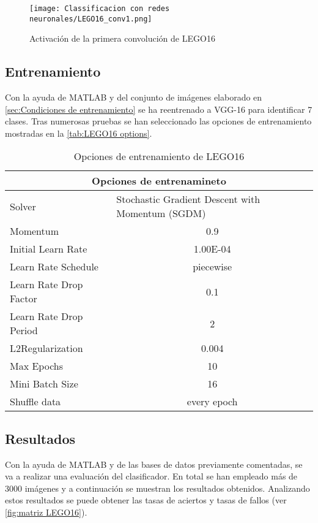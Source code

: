 \begin{figure}[ht]  %
	\centering
	\texttt{[image: Classificacion con redes neuronales/LEGO16\_conv1.png]}
	\caption{Activación de la primera convolución de LEGO16}
	\label{fig:LEGO16 conv}
	\vspace{-5pt}
\end{figure}


\subsection{Entrenamiento}
Con la ayuda de MATLAB y del conjunto de imágenes elaborado en \autoref{sec:Condiciones de entrenamiento} se ha reentrenado a VGG-16 para identificar 7 clases. Tras numerosas pruebas se han seleccionado las opciones de entrenamiento mostradas en la \autoref{tab:LEGO16 options}.

\begin{table}[ht]
  \centering
    \begin{tabular}{|l|c|}
    \hline
    \multicolumn{2}{|c|}{Opciones de entrenamineto} \\
    \hline
    Solver & \multicolumn{1}{l|}{Stochastic Gradient Descent with Momentum (SGDM)} \\
    \hline
    Momentum & 0.9 \\
    \hline
    Initial Learn Rate & 1.00E-04 \\
    \hline
    Learn Rate Schedule & piecewise \\
    \hline
    Learn Rate Drop Factor & 0.1 \\
    \hline
    Learn Rate Drop Period & 2 \\
    \hline
    L2Regularization & 0.004 \\
    \hline
    Max Epochs & 10 \\
    \hline
    Mini Batch Size & 16 \\
    \hline
    Shuffle data & every epoch \\
    \hline
    \end{tabular}%
  \caption{Opciones de entrenamiento de LEGO16}
  \label{tab:LEGO16 options}%
\end{table}%

\newpage
\subsection{Resultados}
Con la ayuda de MATLAB y de las bases de datos previamente comentadas, se va a realizar una evaluación del clasificador. En total se han empleado más de 3000 imágenes y a continuación se muestran los resultados obtenidos. Analizando estos resultados se puede obtener las tasas de aciertos y tasas de fallos (ver \autoref{fig:matriz LEGO16}).


